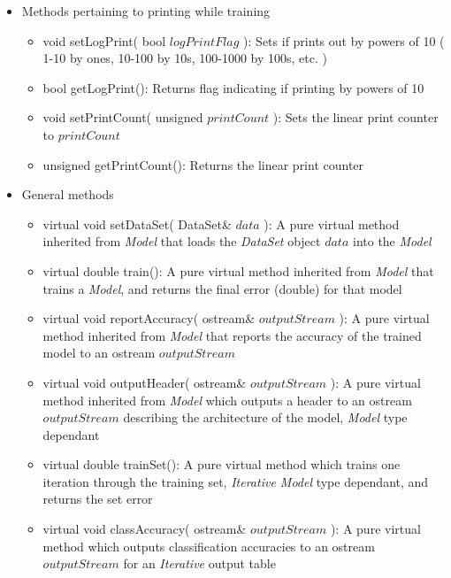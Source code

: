 \documentclass{report}
\def\beginred{\color{red}}
\def\endcolor{\color{black}}
\begin{document}
\begin{itemize}
\begin{itemize}
\begin{itemize}
\end{itemize}

\item Methods pertaining to printing while training
\begin{itemize}
\item void setLogPrint( bool $logPrintFlag$ ): Sets if prints out by
      powers of 10 ( 1-10 by ones, 10-100 by 10s, 100-1000 by 100s,
      etc. )
\item bool getLogPrint(): Returns flag indicating if printing by
      powers of 10
\item void setPrintCount( unsigned $printCount$ ): Sets the linear
      print counter to $printCount$
\item unsigned getPrintCount(): Returns the linear print counter
\end{itemize}

\item General methods
\begin{itemize}
\item \beginred virtual void setDataSet( DataSet\& $data$ ): A pure
      virtual method inherited from {\em Model} that loads the {\em
      DataSet} object $data$ into the {\em Model} \endcolor
\item \beginred virtual double train(): A pure virtual method
      inherited from {\em Model} that trains a {\em Model}, and
      returns the final error (double) for that model \endcolor
\item \beginred virtual void reportAccuracy( ostream\& $outputStream$
      ): A pure virtual method inherited from {\em Model} that reports
      the accuracy of the trained model to an ostream $outputStream$
      \endcolor
\item \beginred virtual void outputHeader( ostream\& $outputStream$ ):
      A pure virtual method inherited from {\em Model} which outputs a
      header to an ostream $outputStream$ describing the architecture
      of the model, {\em Model} type dependant \endcolor
\item \beginred virtual double trainSet(): A pure virtual method which
      trains one iteration through the training set, {\em Iterative
      Model} type dependant, and returns the set error \endcolor
\item \beginred virtual void classAccuracy( ostream\& $outputStream$
      ): A pure virtual method which outputs classification accuracies
      to an ostream $outputStream$ for an {\em Iterative} output table
      \endcolor
\end{itemize}


\end{itemize}
\end{itemize}
\end{document}
